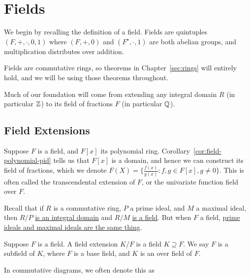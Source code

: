 \chapter{Fields}

\begin{remark}
    We begin by recalling the definition of a field.
    Fields are quintuples \((F,+,\cdot,0,1)\) where
    \((F,+,0)\) and \((F^\star,\cdot,1)\) are both abelian groups,
    and multiplication distributes over addition.
\end{remark}
\begin{remark}
    Fields are commutative rings,
    so theorems in Chapter~\ref{sec:rings} will entirely hold,
    and we will be using those theorems throughout.
\end{remark}
\begin{remark}
    Much of our foundation will come from extending any integral domain \(R\)
    (in particular \(\mathbb{Z}\))
    to its field of fractions \(F\) (in particular \(\mathbb{Q}\)).
\end{remark}


\section{Field Extensions}

\begin{definition}
    Suppose \(F\) is a field, and \(F[x]\) its polynomial ring.
    Corollary~\ref{cor:field-polynomial-pid} tells us that
    \(F[x]\) is a domain,
    and hence we can construct its field of fractions,
    which we denote \(F(X) = \{\frac{f(x)}{g(x)} : f,g \in F[x], g \neq 0\}\).
    This is often called the transcendental extension of \(F\),
    or the univariate function field over \(F\).
\end{definition}

\begin{remark}
    Recall that if \(R\) is a commutative ring,
    \(P\) a prime ideal, and \(M\) a maximal ideal,
    then \(R/P\) \hyperref[prop:prime-quotient-domain]{is an integral domain}
    and \(R/M\) \hyperref[cor:maximal-quotient-field]{is a field}.
    But when \(F\) a field,
    \hyperref[prop:pid-maximal-is-prime]{prime ideals and maximal ideals are the same thing}.
\end{remark}

\begin{definition}
    Suppose \(F\) is a field.
    A field extension \(K/F\) is a field \(K \supseteq F\).
    We say \(F\) is a subfield of \(K\),
    where \(F\) is a base field, and \(K\) is an over field of \(F\).

    In commutative diagrams, we often denote this as
    \begin{center}
    \end{center}
\end{definition}

